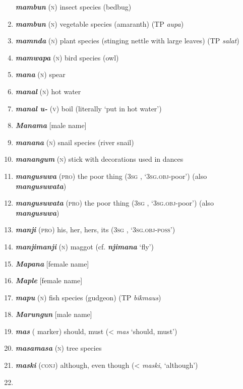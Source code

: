 \begin{enumerate}[noitemsep, label={}, align=left, widest=190, labelsep=1ex,leftmargin=*,itemindent=-10pt]
\textbf{\textit{mambun}} (\textsc{n}) insect species (bedbug) \item 
\textbf{\textit{mambun}} (\textsc{n}) vegetable species (amaranth) (TP \textit{aupa}) \item 
\textbf{\textit{mamnda}} (\textsc{n}) plant species (stinging nettle with large leaves) (TP \textit{salat}) \item 
\textbf{\textit{mamwapa}} (\textsc{n}) bird species (owl) \item 
\textbf{\textit{mana}} (\textsc{n}) spear \item 
\textbf{\textit{manal}} (\textsc{n}) hot water \item 
\textbf{\textit{manal u-}} (\textsc{v}) boil (literally ‘put in hot water’) \item 
\textbf{\textit{Manama}} [male name] \item 
\textbf{\textit{manana}} (\textsc{n}) snail species (river snail) \item 
\textbf{\textit{manangum}} (\textsc{n}) stick with decorations used in dances \item 
\textbf{\textit{mangusuwa}} (\textsc{pro}) the poor thing (3\textsc{sg} , ‘\textsc{3sg.obj}-poor’) 
 \linebreak (also \textbf{\textit{mangusuwata}}) \item 
\textbf{\textit{mangusuwata}} (\textsc{pro}) the poor thing (3\textsc{sg} , ‘\textsc{3sg.obj}-poor’)  \linebreak (also \textbf{\textit{mangusuwa}}) \item 
\textbf{\textit{manji}} (\textsc{pro}) his, her, hers, its (3\textsc{sg} , ‘\textsc{3sg.obj-poss}’) \item 
\textbf{\textit{manjimanji}} (\textsc{n}) maggot (cf. \textbf{\textit{njimana}} ‘fly’) \item 
\textbf{\textit{Mapana}} [female name] \item 
\textbf{\textit{Maple}} [female name] \item 
\textbf{\textit{mapu}} (\textsc{n}) fish species (gudgeon) (TP \textit{bikmaus}) \item 
\textbf{\textit{Marungun}} [male name] \item 
\textbf{\textit{mas}} ( marker) should, must (<  \textit{mas} ‘should, must’) \item 
\textbf{\textit{masamasa}} (\textsc{n}) tree species \item 
\textbf{\textit{maski}} (\textsc{conj}) although, even though (<  \textit{maski}, ‘although’) \item 

\end{enumerate}
